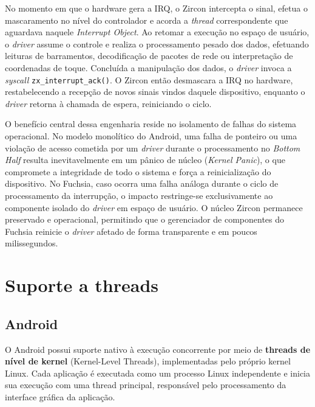 \documentclass[12pt,a4paper]{article}
\begin{document}
No momento em que o hardware gera a IRQ, o Zircon intercepta o sinal, efetua o
mascaramento no nível do controlador e acorda a \emph{thread} correspondente que
aguardava naquele \emph{Interrupt Object}. Ao retomar a execução no espaço de
usuário, o \emph{driver} assume o controle e realiza o processamento pesado dos
dados, efetuando leituras de barramentos, decodificação de pacotes de rede ou
interpretação de coordenadas de toque. Concluída a manipulação dos dados, o
\emph{driver} invoca a \emph{syscall} \texttt{zx\_interrupt\_ack()}. O Zircon
então desmascara a IRQ no hardware, restabelecendo a recepção de novos sinais
vindos daquele dispositivo, enquanto o \emph{driver} retorna à chamada de
espera, reiniciando o ciclo.

O benefício central dessa engenharia reside no isolamento de falhas do sistema
operacional. No modelo monolítico do Android, uma falha de ponteiro ou uma
violação de acesso cometida por um \emph{driver} durante o processamento no
\emph{Bottom Half} resulta inevitavelmente em um pânico de núcleo (\emph{Kernel
Panic}), o que compromete a integridade de todo o sistema e força a
reinicialização do dispositivo. No Fuchsia, caso ocorra uma falha análoga
durante o ciclo de processamento da interrupção, o impacto restringe-se
exclusivamente ao componente isolado do \emph{driver} em espaço de usuário. O
núcleo Zircon permanece preservado e operacional, permitindo que o gerenciador
de componentes do Fuchsia reinicie o \emph{driver} afetado de forma transparente
e em poucos milissegundos.


\section{Suporte a threads}
\label{sec:threads}

\subsection{Android}

O Android possui suporte nativo à execução concorrente por meio de
\textbf{threads de nível de kernel} (Kernel-Level Threads), implementadas pelo
próprio kernel Linux. Cada aplicação é executada como um processo Linux
independente e inicia sua execução com uma thread principal, responsável pelo
processamento da interface gráfica da aplicação.
\end{document}
